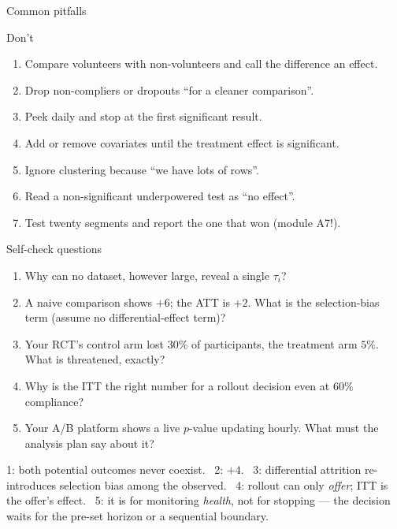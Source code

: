 \documentclass[aspectratio=169,11pt]{beamer}
\begin{document}
\begin{frame}{Common pitfalls}
  \begin{alertblock}{Don't}
    \begin{enumerate}
      \item Compare volunteers with non-volunteers and call the difference an effect.
      \item Drop non-compliers or dropouts ``for a cleaner comparison''.
      \item Peek daily and stop at the first significant result.
      \item Add or remove covariates until the treatment effect is significant.
      \item Ignore clustering because ``we have lots of rows''.
      \item Read a non-significant underpowered test as ``no effect''.
      \item Test twenty segments and report the one that won (module A7!).
    \end{enumerate}
  \end{alertblock}
\end{frame}

\begin{frame}{Self-check questions}
  \footnotesize
  \begin{readme}
    \begin{enumerate}
      \item Why can no dataset, however large, reveal a single $\tau_i$?
      \item A naive comparison shows $+6$; the ATT is $+2$. What is the selection-bias
            term (assume no differential-effect term)?
      \item Your RCT's control arm lost $30\%$ of participants, the treatment arm $5\%$.
            What is threatened, exactly?
      \item Why is the ITT the right number for a rollout decision even at $60\%$
            compliance?
      \item Your A/B platform shows a live $p$-value updating hourly. What must the
            analysis plan say about it?
    \end{enumerate}
  \end{readme}
  \begin{takeaway}
    1: both potential outcomes never coexist. \ 2: $+4$. \ 3: differential attrition
    re-introduces selection bias among the observed. \ 4: rollout can only \emph{offer};
    ITT is the offer's effect. \ 5: it is for monitoring \emph{health}, not for stopping
    --- the decision waits for the pre-set horizon or a sequential boundary.
  \end{takeaway}
\end{frame}
\end{document}
